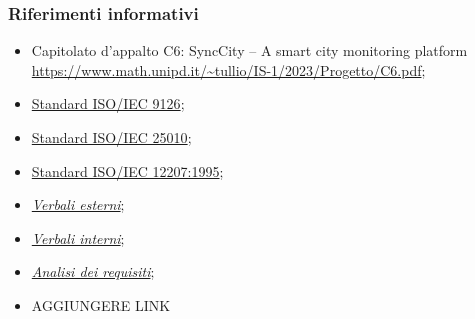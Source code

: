 \subsubsection{Riferimenti informativi}
\begin{itemize}
    \item Capitolato d'appalto C6: SyncCity – A smart city monitoring platform\\
    \url{https://www.math.unipd.it/~tullio/IS-1/2023/Progetto/C6.pdf};
    \item \href{https://it.wikipedia.org/wiki/ISO/IEC_9126}{Standard ISO/IEC 9126};
    \item \href{https://iso25000.com/index.php/en/iso-25000-standards/iso-25010}{Standard ISO/IEC 25010};
    \item \href{ https://en.wikipedia.org/wiki/ISO/IEC_12207}{Standard ISO/IEC 12207:1995};
    \item \href{URL}{\textit{Verbali esterni}};
    \item \href{URL}{\textit{Verbali interni}};
    \item \href{URL}{\textit{Analisi dei requisiti}};
    \item AGGIUNGERE LINK
\end{itemize}